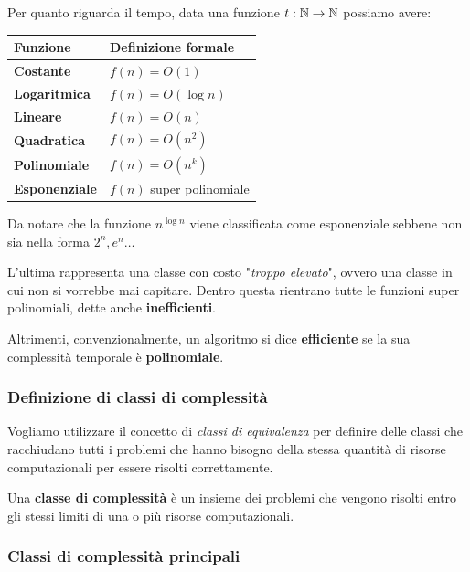 Per quanto riguarda il tempo, data una funzione $t: \mathbb{N} \rightarrow \mathbb{N}$ possiamo avere: 
\begin{center}
	\centering
	\renewcommand{\arraystretch}{1.8}
	\begin{tabular}{| C{100000000000em} | C{100000000000000000em} |}
		\hline
		\textbf{Funzione} & \textbf{Definizione formale} \\
		\hline
		\textbf{Costante} & $f(n) = O(1)$ \\
		\hline
		\textbf{Logaritmica} & $f(n) = O(\log n)$ \\
		\hline
		\textbf{Lineare} & $f(n) = O(n)$ \\
		\hline
	  \textbf{Quadratica} & $f(n)
							= O(n^2)$ \\
		\hline
		\textbf{Polinomiale} & $f(n) = O(n^k)$ \\
		\hline
		\textbf{Esponenziale} & $f(n)$ super polinomiale \\
		\hline
	\end{tabular}
\end{center}

Da notare che la funzione $n^{\log n}$ viene classificata come esponenziale sebbene non sia nella forma $2^{n}, e^{n} \dots$

L'ultima rappresenta una classe con costo "\textit{troppo elevato}", ovvero una classe in cui non si vorrebbe mai capitare. Dentro questa rientrano tutte le funzioni super polinomiali, dette anche \textbf{inefficienti}.

Altrimenti, convenzionalmente, un algoritmo si dice \textbf{efficiente} se la sua complessità temporale è \textbf{polinomiale}.

\subsubsection{Definizione di classi di complessità}

Vogliamo utilizzare il concetto di \textit{classi di equivalenza} per definire delle classi che racchiudano tutti i problemi che hanno bisogno della stessa quantità di risorse computazionali per essere risolti correttamente.

Una \textbf{classe di complessità} è un insieme dei problemi che vengono risolti entro gli stessi limiti di una o più risorse computazionali.

\subsubsection{Classi di complessità principali}

